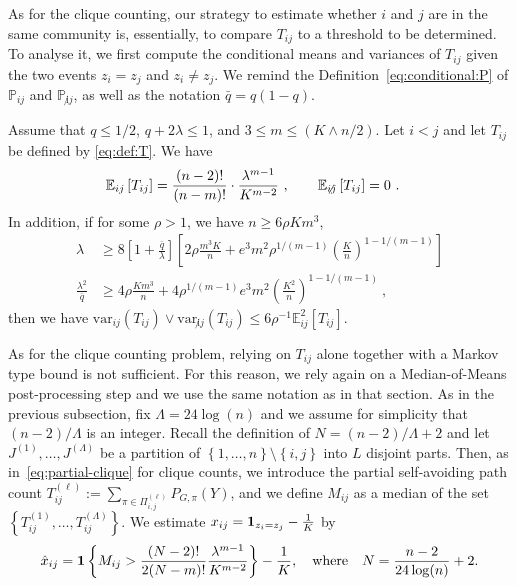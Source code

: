 \documentclass[final]{colt2026}
\newcommand{\1}{\mathbf{1}}
\newcommand{\bbE}{\mathbb{E}}
\newcommand{\bbP}{\mathbb{P}}
\newcommand{\ac}[1]{\left\{#1\right\}}
\newcommand{\cro}[1]{\left[#1\right]}
\begin{document}
As for the clique counting, our strategy to estimate whether $i$ and $j$ are in the same community is, essentially, to compare $T_{ij}$ to a  threshold to be determined. To analyse it, we first compute the conditional means and variances of $T_{ij}$ given the two events $z_{i}=z_{j}$ and $z_{i}\neq z_{j}$.
We remind the Definition~\eqref{eq:conditional:P} of $\bbP_{ij}$ and $\bbP_{\not ij}$, as well as the notation $\bar q=q(1-q)$.  



\begin{proposition}\label{prop:mean:variance:path}
 Assume that $q\leq 1/2$, $q+2\lambda \leq 1$, and $3\leq m\leq (K\wedge n/2)$.
Let $i<j$ and let $T_{ij}$ be defined by \eqref{eq:def:T}.
We have 
\begin{align}
\bbE_{ij}\cro{T_{ij}}&={(n-2)!\over (n-m)!} \cdot \frac{\lambda^{m-1}}{K^{m-2}}\ , \quad \quad \nonumber
\bbE_{\not ij}\cro{T_{ij}}= 0\ . 
\end{align}
In addition, if for some $\rho>1$, we have $n\geq 6\rho K m^3$,  
\begin{align}
    \lambda &\geq 8\left[1+ \frac{\bar{q}}{\lambda}\right]  \left[2\rho \frac{m^3K}{n}+ e^3m^2 \rho^{1/(m-1)}\left(\frac{K}{n}\right)^{1-1/(m-1)}\right] \\ 
    \frac{\lambda^2}{\bar{q}} & \geq 4\rho \frac{Km^3}{n}+ 4 \rho^{1/(m-1)}e^3m^2 \left(\frac{K^2}{n}\right)^{1-1/(m-1)}\ ,   
\nonumber 
\end{align}
then we have $\mathrm{var}_{ij}(T_{ij})\vee \mathrm{var}_{\not ij}(T_{ij})   \leq 6 \rho^{-1}\bbE_{ij}^2\cro{T_{ij}}$.
\end{proposition}
As for the clique counting problem, relying on $T_{ij}$ alone together with a Markov type bound is not sufficient. For this reason, we rely again on a Median-of-Means post-processing step and we use the same notation as in that section.  As in the previous subsection, fix $\Lambda= 24\log(n)$ and we assume for simplicity that $(n-2)/\Lambda$ is an integer. Recall 
the  definition of $N=(n-2)/\Lambda+2$ and let $J^{(1)},\ldots,J^{(\Lambda)}$ be a partition of $\ac{1,\ldots,n}\setminus\ac{i,j}$ into $L$ disjoint parts. Then, as in~\eqref{eq:partial-clique} for clique counts, we introduce the partial self-avoiding path count  $T_{ij}^{(\ell)}:= \sum_{\pi \in \Pi_{i,j}^{(\ell)}} P_{G,\pi}(Y)$, and we define $M_{ij}$ as a median of the set $\ac{T^{(1)}_{ij},\ldots,T^{(\Lambda)}_{ij}}$. We estimate  $x_{ij}={\bf 1}_{z_{i}=z_{j}}-{1\over K}$ by 
\begin{equation}\label{eq:hatx:path}
\hat x_{ij}=\mathbf{1}\ac{M_{ij}> {(N-2)!\over 2(N-m)!} {\lambda^{m-1} \over K^{m-2}}}-{1\over K},\quad \text{where}\quad N={n-2\over 24 \log(n)}+2.
\end{equation}
\end{document}
